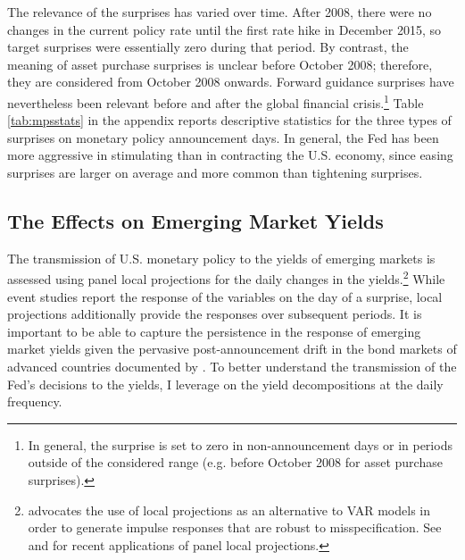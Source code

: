{%
The relevance of the surprises has varied over time.
After 2008, there were no changes in the current policy rate until the first rate hike in December 2015, so target surprises were essentially zero during that period.
By contrast, the meaning of asset purchase surprises is unclear before October 2008; therefore, they %
are considered from October 2008 onwards.
Forward guidance surprises have nevertheless been relevant before and after the global financial crisis.\footnote{ In general, the surprise is set to zero in non-announcement days or in periods outside of the considered range (e.g. before October 2008 for asset purchase surprises).}
Table \ref{tab:mpsstats} in the appendix reports descriptive statistics for the three types of surprises on monetary policy announcement days.
In general, the Fed has been more aggressive in stimulating than in contracting the U.S. economy, since easing surprises are larger on average and more common than tightening surprises.


\subsection{The Effects on Emerging Market Yields} \label{sec:LPs} %
\iftoggle{toclinks}{\gototoc}{} %

The transmission of U.S. monetary policy to the yields of emerging markets is assessed using panel local projections for the daily changes in the 
yields.\footnote{ \cite{Jorda:2005} advocates the use of local projections as an alternative to VAR models in order to generate impulse responses that are robust to misspecification. See \cite{HofmannShimShin:2019} and \cite{ACDM:2019} for recent applications of panel local projections.}
While event studies report the response of the variables on the day of a surprise,
local projections %
additionally provide the responses over subsequent periods.
It is important to be able to capture the persistence in the response of emerging market yields given the pervasive post-announcement drift in the bond markets 
of advanced countries documented by \cite{BrooksKatzLustig:2019}.
To better understand the transmission of the Fed's decisions to the yields, I leverage on the yield decompositions at the daily frequency. %

}
